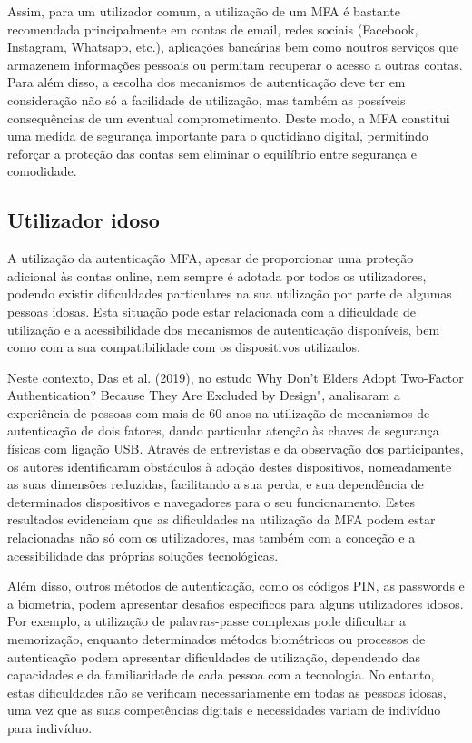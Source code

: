 \hspace{1cm} Assim, para um utilizador comum, a utilização de um MFA é bastante recomendada principalmente em contas de email, redes sociais (Facebook, Instagram, Whatsapp, etc.), aplicações bancárias bem como noutros serviços que armazenem informações pessoais ou permitam recuperar o acesso a outras contas. Para além disso, a escolha dos mecanismos de autenticação deve ter em consideração não só a facilidade de utilização, mas também as possíveis consequências de um eventual comprometimento. Deste modo, a MFA constitui uma medida de segurança importante para o quotidiano digital, permitindo reforçar a proteção das contas sem eliminar o equilíbrio entre segurança e comodidade.

\subsection{Utilizador idoso}

\hspace{1cm} A utilização da autenticação MFA, apesar de proporcionar uma proteção adicional às contas online, nem sempre é adotada por todos os utilizadores, podendo existir dificuldades particulares na sua utilização por parte de algumas pessoas idosas. Esta situação pode estar relacionada com a dificuldade de utilização e a acessibilidade dos mecanismos de autenticação disponíveis, bem como com a sua compatibilidade com os dispositivos utilizados.

\hspace{1cm} Neste contexto, Das et al. (2019), no estudo Why Don’t Elders Adopt Two-Factor Authentication? Because They Are Excluded by Design", analisaram a experiência de pessoas com mais de 60 anos na utilização de mecanismos de autenticação de dois fatores, dando particular atenção às chaves de segurança físicas com ligação USB. Através de entrevistas e da observação dos participantes, os autores identificaram obstáculos à adoção destes dispositivos, nomeadamente as suas dimensões reduzidas, facilitando a sua perda, e sua dependência de determinados dispositivos e navegadores para o seu funcionamento. Estes resultados evidenciam que as dificuldades na utilização da MFA podem estar relacionadas não só com os utilizadores, mas também com a conceção e a acessibilidade das próprias soluções tecnológicas.

\hspace{1cm} Além disso, outros métodos de autenticação, como os códigos PIN, as passwords e a biometria, podem apresentar desafios específicos para alguns utilizadores idosos. Por exemplo, a utilização de palavras-passe complexas pode dificultar a memorização, enquanto determinados métodos biométricos ou processos de autenticação podem apresentar dificuldades de utilização, dependendo das capacidades e da familiaridade de cada pessoa com a tecnologia. No entanto, estas dificuldades não se verificam necessariamente em todas as pessoas idosas, uma vez que as suas competências digitais e necessidades variam de indivíduo para indivíduo.

